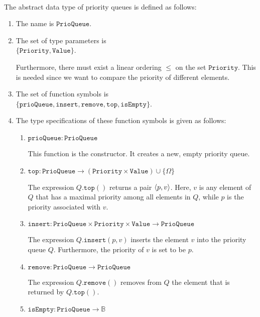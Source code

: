 \begin{Definition} \hspace*{\fill} \\
  The abstract data type of priority queues is defined as follows:
  \begin{enumerate}
  \item The name is $\mathtt{PrioQueue}$.
  \item The set of type parameters is \\[0.1cm]
        \hspace*{1.3cm} $\{ \mathtt{Priority}, \mathtt{Value} \}$.

        Furthermore, there must exist a linear ordering $\leq$ on the set $\mathtt{Priority}$.
        This is needed since we want to compare the priority of different elements.
  \item The set of function symbols is \\[0.1cm]
       \hspace*{1.3cm} 
       $\{ \mathtt{prioQueue}, \mathtt{insert}, \mathtt{remove}, \mathtt{top}, \mathtt{isEmpty} \}$.
  \item The type specifications of these function symbols is given as follows:
        \begin{enumerate}
        \item $\mathtt{prioQueue}: \mathtt{PrioQueue}$

              This function is the constructor. It creates a new, empty priority queue.
        \item $\mathtt{top}: \mathtt{PrioQueue}  \rightarrow (\mathtt{Priority} \times \mathtt{Value}) \cup \{\Omega\}$

              The expression $Q.\mathtt{top}()$ returns a pair $\pair(p,v)$.  Here,  $v$ is any
              element of $Q$ that has a  maximal priority among all elements in $Q$, while $p$ is
              the priority associated with $v$. 
        \item $\mathtt{insert}: \mathtt{PrioQueue} \times \mathtt{Priority} \times \mathtt{Value} \rightarrow \mathtt{PrioQueue}$

              The expression $Q.\mathtt{insert}(p,v)$ inserts the  element $v$ into the priority queue $Q$.
              Furthermore, the priority of $v$ is set to be $p$.
        \item $\mathtt{remove}: \mathtt{PrioQueue} \rightarrow \mathtt{PrioQueue}$

              The expression $Q.\mathtt{remove}()$ removes from $Q$ the element that is returned by
              $Q.\texttt{top}()$.
        \item $\mathtt{isEmpty}: \mathtt{PrioQueue} \rightarrow \mathbb{B}$


\end{enumerate}
\end{enumerate}
\end{Definition}

